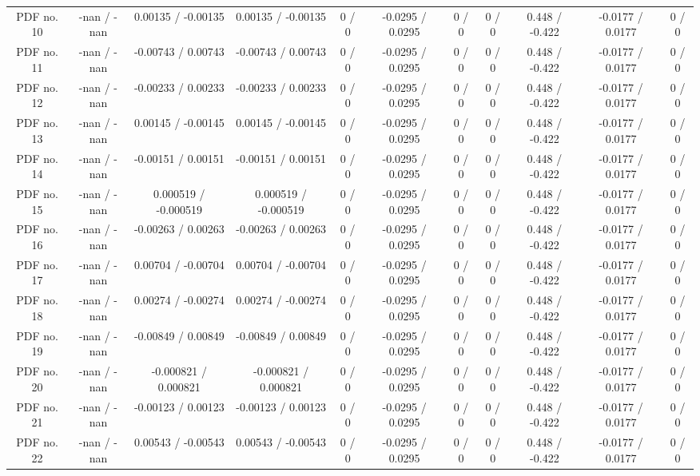 \begin{table}[htbp]
\begin{center}
\begin{tabular}{|c|c|c|c|c|c|c|c|c|c|c|}
  PDF no. 10 & -nan / -nan & 0.00135 / -0.00135 & 0.00135 / -0.00135 & 0 / 0 & -0.0295 / 0.0295 & 0 / 0 & 0 / 0 & 0.448 / -0.422 & -0.0177 / 0.0177 & 0 / 0 \\ 
  PDF no. 11 & -nan / -nan & -0.00743 / 0.00743 & -0.00743 / 0.00743 & 0 / 0 & -0.0295 / 0.0295 & 0 / 0 & 0 / 0 & 0.448 / -0.422 & -0.0177 / 0.0177 & 0 / 0 \\ 
  PDF no. 12 & -nan / -nan & -0.00233 / 0.00233 & -0.00233 / 0.00233 & 0 / 0 & -0.0295 / 0.0295 & 0 / 0 & 0 / 0 & 0.448 / -0.422 & -0.0177 / 0.0177 & 0 / 0 \\ 
  PDF no. 13 & -nan / -nan & 0.00145 / -0.00145 & 0.00145 / -0.00145 & 0 / 0 & -0.0295 / 0.0295 & 0 / 0 & 0 / 0 & 0.448 / -0.422 & -0.0177 / 0.0177 & 0 / 0 \\ 
  PDF no. 14 & -nan / -nan & -0.00151 / 0.00151 & -0.00151 / 0.00151 & 0 / 0 & -0.0295 / 0.0295 & 0 / 0 & 0 / 0 & 0.448 / -0.422 & -0.0177 / 0.0177 & 0 / 0 \\ 
  PDF no. 15 & -nan / -nan & 0.000519 / -0.000519 & 0.000519 / -0.000519 & 0 / 0 & -0.0295 / 0.0295 & 0 / 0 & 0 / 0 & 0.448 / -0.422 & -0.0177 / 0.0177 & 0 / 0 \\ 
  PDF no. 16 & -nan / -nan & -0.00263 / 0.00263 & -0.00263 / 0.00263 & 0 / 0 & -0.0295 / 0.0295 & 0 / 0 & 0 / 0 & 0.448 / -0.422 & -0.0177 / 0.0177 & 0 / 0 \\ 
  PDF no. 17 & -nan / -nan & 0.00704 / -0.00704 & 0.00704 / -0.00704 & 0 / 0 & -0.0295 / 0.0295 & 0 / 0 & 0 / 0 & 0.448 / -0.422 & -0.0177 / 0.0177 & 0 / 0 \\ 
  PDF no. 18 & -nan / -nan & 0.00274 / -0.00274 & 0.00274 / -0.00274 & 0 / 0 & -0.0295 / 0.0295 & 0 / 0 & 0 / 0 & 0.448 / -0.422 & -0.0177 / 0.0177 & 0 / 0 \\ 
  PDF no. 19 & -nan / -nan & -0.00849 / 0.00849 & -0.00849 / 0.00849 & 0 / 0 & -0.0295 / 0.0295 & 0 / 0 & 0 / 0 & 0.448 / -0.422 & -0.0177 / 0.0177 & 0 / 0 \\ 
  PDF no. 20 & -nan / -nan & -0.000821 / 0.000821 & -0.000821 / 0.000821 & 0 / 0 & -0.0295 / 0.0295 & 0 / 0 & 0 / 0 & 0.448 / -0.422 & -0.0177 / 0.0177 & 0 / 0 \\ 
  PDF no. 21 & -nan / -nan & -0.00123 / 0.00123 & -0.00123 / 0.00123 & 0 / 0 & -0.0295 / 0.0295 & 0 / 0 & 0 / 0 & 0.448 / -0.422 & -0.0177 / 0.0177 & 0 / 0 \\ 
  PDF no. 22 & -nan / -nan & 0.00543 / -0.00543 & 0.00543 / -0.00543 & 0 / 0 & -0.0295 / 0.0295 & 0 / 0 & 0 / 0 & 0.448 / -0.422 & -0.0177 / 0.0177 & 0 / 0 \\ 

\end{tabular}
\end{center}
\end{table}
